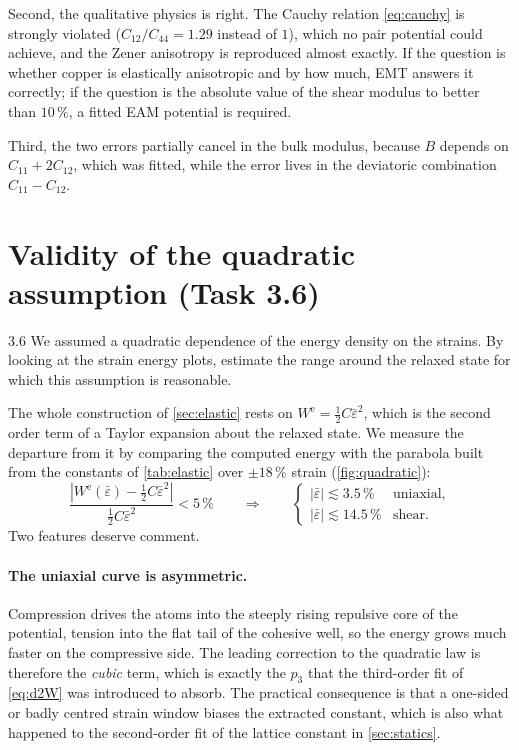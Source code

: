 \documentclass[11pt,a4paper]{article}
\numberwithin{equation}{section}
\theoremstyle{remark}
\newcommand{\We}{W^{\mathrm{e}}}
\newcommand{\epsb}{\bar{\varepsilon}}
\begin{document}
Second, the qualitative physics is right. The Cauchy relation \cref{eq:cauchy} is strongly violated
($C_{12}/C_{44} = 1.29$ instead of $1$), which no pair potential could achieve, and the Zener
anisotropy is reproduced almost exactly. If the question is whether copper is elastically anisotropic
and by how much, EMT answers it correctly; if the question is the absolute value of the shear modulus
to better than $10\,\%$, a fitted EAM potential is required.

Third, the two errors partially cancel in the bulk modulus, because $B$ depends on $C_{11}+2C_{12}$,
which was fitted, while the error lives in the deviatoric combination $C_{11}-C_{12}$.

\section{Validity of the quadratic assumption (Task 3.6)}\label{sec:quadratic}

\begin{task}{3.6}
  We assumed a quadratic dependence of the energy density on the strains. By looking at the strain
  energy plots, estimate the range around the relaxed state for which this assumption is reasonable.
\end{task}

The whole construction of \cref{sec:elastic} rests on $\We = \tfrac12 C\epsb^2$, which is the second
order term of a Taylor expansion about the relaxed state. We measure the departure from it by
comparing the computed energy with the parabola built from the constants of \cref{tab:elastic} over
$\pm18\,\%$ strain (\cref{fig:quadratic}):
\begin{equation}\label{eq:validity}
  \frac{\left|\We(\epsb) - \tfrac12 C\epsb^2\right|}{\tfrac12 C\epsb^2} < 5\,\%
  \qquad\Longrightarrow\qquad
  \begin{cases}
    |\epsb| \lesssim 3.5\,\% & \text{uniaxial},\\[2pt]
    |\epsb| \lesssim 14.5\,\% & \text{shear}.
  \end{cases}
\end{equation}
Two features deserve comment.

\paragraph{The uniaxial curve is asymmetric.}
Compression drives the atoms into the steeply rising repulsive core of the potential, tension into the
flat tail of the cohesive well, so the energy grows much faster on the compressive side. The leading
correction to the quadratic law is therefore the \emph{cubic} term, which is exactly the $p_3$ that the
third-order fit of \cref{eq:d2W} was introduced to absorb. The practical consequence is that a
one-sided or badly centred strain window biases the extracted constant, which is also what happened to
the second-order fit of the lattice constant in \cref{sec:statics}.
\end{document}
